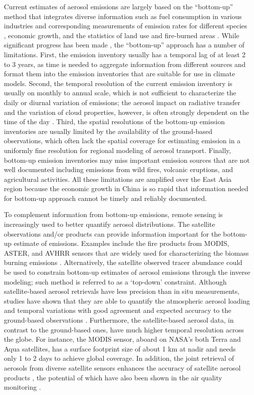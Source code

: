  Current estimates of aerosol emissions are largely based on the “bottom-up” 
method that integrates diverse information such as fuel consumption in various
industries and corresponding measurements of emission rates for different
species \citep{Streets03}, economic growth, and the statistics of land use
and fire-burned areas \citep{vanderWerf06}. While significant progress has
been made \citep{Streets06}, the “bottom-up” approach has a number of 
limitations. First, the emission inventory usually has a temporal lag of at
least 2 to 3 years, as time is needed to aggregate information from different
sources and format them into the emission inventories that are suitable for 
use in climate models. Second, the temporal resolution of the current emission
inventory is usually on monthly to annual scale, which is not sufficient to 
characterize the daily or diurnal variation of emissions; the aerosol impact 
on radiative transfer and the variation of cloud properties,  however, is 
often strongly dependent on the time of the day \citep{Wang06}. Third, the
spatial resolutions of the bottom-up emission inventories are usually 
limited by the availability of the ground-based observations, which often lack
the spatial coverage for estimating emission in a uniformly fine resolution 
for regional modeling of aerosol transport. Finally, bottom-up emission 
inventories may miss important emission sources that are not well documented 
including emissions from wild fires, volcanic eruptions, and agricultural 
activities. All these limitations are amplified over the East Asia region
 because the economic growth in China is so rapid that information needed
 for bottom-up approach cannot be timely and reliably documented.

 To complement information from bottom-up emissions, remote sensing is 
increasingly used to better quantify aerosol distributions. The satellite 
observations and/or products can provide information important for the 
bottom-up estimate of emissions. Examples include the fire products from 
MODIS, ASTER, and AVHRR sensors that are widely used for characterizing the 
biomass burning emissions \citep{Borrego08, vanderWerf06, vanderWerf10,
Reid09}. Alternatively, the satellite observed tracer abundance could be used
to constrain bottom-up estimates of aerosol emissions through the inverse 
modeling; such method is referred to as a ‘top-down’ constraint.
Although satellite-based aerosol retrievals have less precision than in situ 
measurements, studies have shown that they are able to quantify the 
atmospheric aerosol loading and temporal variations with good agreement and 
expected accuracy to the ground-based observations \citep{Levy10,
Remer05}. Furthermore, the satellite-based aerosol data, in contrast to the 
ground-based ones, have much higher temporal resolution across the globe. 
For instance, the MODIS sensor, aboard on NASA’s both Terra and Aqua 
satellites, has a surface footprint size of about 1 km at nadir and needs 
only 1 to 2 days to achieve global coverage. In addition, the joint retrieval
of aerosols from diverse satellite sensors enhances the accuracy of satellite
aerosol products \citep{Sinyuk08}, the potential of which have also been
shown in the air quality monitoring \citep{Liu05, Wang10}.

